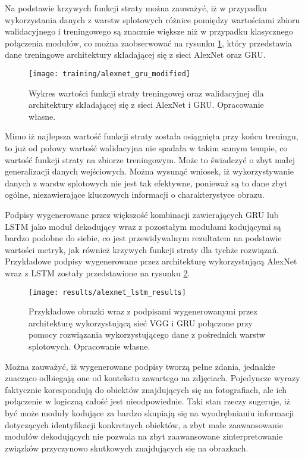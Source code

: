 Na podstawie krzywych funkcji straty można zauważyć, iż w przypadku wykorzystania danych z warstw splotowych różnice pomiędzy wartościami zbioru walidacyjnego i treningowego są znacznie większe niż w przypadku klasycznego połączenia modułów, co można zaobserwować na rysunku \ref{fig:training-alexnet-gru-modified}, który przedstawia dane treningowe architektury składającej się z sieci AlexNet oraz GRU.
\begin{figure}[H]
    \centering
    \texttt{[image: training/alexnet\_gru\_modified]}
    \caption{Wykres wartości funkcji straty treningowej oraz walidacyjnej dla architektury składającej się z sieci AlexNet i GRU. Opracowanie własne.}
    \label{fig:training-alexnet-gru-modified}
\end{figure}
\noindent Mimo iż najlepsza wartość funkcji straty została osiągnięta przy końcu treningu, to już od połowy wartość walidacyjna nie spadała w takim samym tempie, co wartość funkcji straty na zbiorze treningowym. Może to świadczyć o zbyt małej generalizacji danych wejściowych. Można wysunąć wniosek, iż wykorzystywanie danych z warstw splotowych nie jest tak efektywne, ponieważ są to dane zbyt ogólne, niezawierające kluczowych informacji o charakterystyce obrazu.

Podpisy wygenerowane przez większość kombinacji zawierających GRU lub LSTM jako moduł dekodujący wraz z pozostałym modułami kodującymi są bardzo podobne do siebie, co jest przewidywalnym rezultatem na podstawie wartości metryk, jak również krzywych funkcji straty dla tychże rozwiązań. Przykładowe podpisy wygenerowane przez architekturę wykorzystującą AlexNet wraz z LSTM zostały przedstawione na rysunku \ref{fig:results-alexnet-lstm-modified}.
\begin{figure}[H]
    \centering
    \texttt{[image: results/alexnet\_lstm\_results]}
    \caption{Przykładowe obrazki wraz z podpisami wygenerowanymi przez architekturę wykorzystującą sieć VGG i GRU połączone przy pomocy rozwiązania wykorzystującego dane z pośrednich warstw splotowych. Opracowanie własne.}
    \label{fig:results-alexnet-lstm-modified}
\end{figure}
\noindent Można zauważyć, iż wygenerowane podpisy tworzą pełne zdania, jednakże znacząco odbiegają one od kontekstu zawartego na zdjęciach. Pojedyncze wyrazy faktycznie korespondują do obiektów znajdujących się na fotografiach, ale ich połączenie w logiczną całość jest nieodpowiednie. Taki stan rzeczy sugeruje, iż być może moduły kodujące za bardzo skupiają się na wyodrębnianiu informacji dotyczących identyfikacji konkretnych obiektów, a zbyt małe zaawansowanie modułów dekodujących nie pozwala na zbyt zaawansowane zinterpretowanie związków przyczynowo skutkowych znajdujących się na obrazkach.
